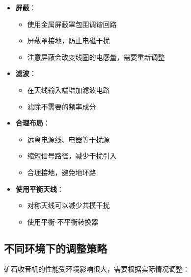 \documentclass[12pt,UTF8]{ctexbook}
\begin{document}
\begin{itemize}[leftmargin=3.5em]
    \item \textbf{屏蔽}：
        \begin{itemize}[leftmargin=3.5em]
            \item 使用金属屏蔽罩包围调谐回路
            \item 屏蔽罩接地，防止电磁干扰
            \item 注意屏蔽会改变线圈的电感量，需要重新调整
        \end{itemize}
    \item \textbf{滤波}：
        \begin{itemize}[leftmargin=3.5em]
            \item 在天线输入端增加滤波电路
            \item 滤除不需要的频率成分
        \end{itemize}
    \item \textbf{合理布局}：
        \begin{itemize}[leftmargin=3.5em]
            \item 远离电源线、电器等干扰源
            \item 缩短信号路径，减少干扰引入
            \item 合理接地，避免地环路
        \end{itemize}
    \item \textbf{使用平衡天线}：
        \begin{itemize}[leftmargin=3.5em]
            \item 对称天线可以减少共模干扰
            \item 使用平衡-不平衡转换器
        \end{itemize}
\end{itemize}

\subsection{不同环境下的调整策略}

矿石收音机的性能受环境影响很大，需要根据实际情况调整：
\end{document}
